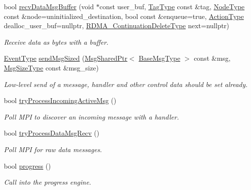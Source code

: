 \begin{DoxyCompactItemize}
bool \hyperlink{structvt_1_1messaging_1_1_active_messenger_a0e2271b6c52382bf2338f35f539225eb}{recv\+Data\+Msg\+Buffer} (void $\ast$const user\+\_\+buf, \hyperlink{namespacevt_a84ab281dae04a52a4b243d6bf62d0e52}{Tag\+Type} const \&tag, \hyperlink{namespacevt_a866da9d0efc19c0a1ce79e9e492f47e2}{Node\+Type} const \&node=uninitialized\+\_\+destination, bool const \&enqueue=true, \hyperlink{namespacevt_ae0a5a7b18cc99d7b732cb4d44f46b0f3}{Action\+Type} dealloc\+\_\+user\+\_\+buf=nullptr, \hyperlink{namespacevt_a4dfad0b5809d9812d60a0311a45ae0c2}{R\+D\+M\+A\+\_\+\+Continuation\+Delete\+Type} next=nullptr)
\begin{DoxyCompactList}\small\item\em Receive data as bytes with a buffer. \end{DoxyCompactList}\item 
\hyperlink{namespacevt_a009267401def7ae8bf201892222d060f}{Event\+Type} \hyperlink{structvt_1_1messaging_1_1_active_messenger_afc1e3353b7679ba30bcd6b9bc6b3c3ff}{send\+Msg\+Sized} (\hyperlink{structvt_1_1messaging_1_1_msg_shared_ptr}{Msg\+Shared\+Ptr}$<$ \hyperlink{namespacevt_a44d0d4e144748f2b19a1cfd962f50338}{Base\+Msg\+Type} $>$ const \&msg, \hyperlink{namespacevt_abfa009d900299ac1df967b40ea8f2c8a}{Msg\+Size\+Type} const \&msg\+\_\+size)
\begin{DoxyCompactList}\small\item\em Low-\/level send of a message, handler and other control data should be set already. \end{DoxyCompactList}\item 
bool \hyperlink{structvt_1_1messaging_1_1_active_messenger_a65ec9bc6f62213cac6320ea76cdd4d47}{try\+Process\+Incoming\+Active\+Msg} ()
\begin{DoxyCompactList}\small\item\em Poll M\+PI to discover an incoming message with a handler. \end{DoxyCompactList}\item 
bool \hyperlink{structvt_1_1messaging_1_1_active_messenger_af4dafc0786bb0515293356e78035a71e}{try\+Process\+Data\+Msg\+Recv} ()
\begin{DoxyCompactList}\small\item\em Poll M\+PI for raw data messages. \end{DoxyCompactList}\item 
bool \hyperlink{structvt_1_1messaging_1_1_active_messenger_ae7cac91699945ad8bf3f36d07628116e}{progress} ()
\begin{DoxyCompactList}\small\item\em Call into the progress engine. \end{DoxyCompactList}\item 

\end{DoxyCompactItemize}
